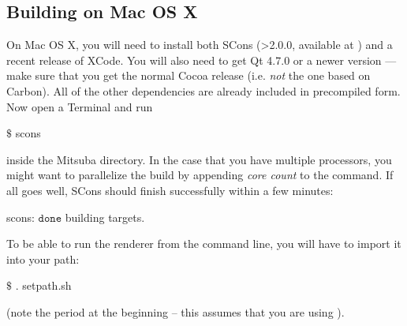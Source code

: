 \subsection{Building on Mac OS X}
On Mac OS X, you will need to install both SCons (>2.0.0, available at ) and 
a recent release of XCode. You will also need to get Qt 4.7.0 or a newer version
--- make sure that you get the normal Cocoa release (i.e. \emph{not} the one based on Carbon). All of the
other dependencies are already included in precompiled form.
Now open a Terminal and run
\begin{shell}
$\text{\$}$ scons
\end{shell}
inside the Mitsuba directory. In the case that you have multiple processors, you might want to parallelize the build by appending \emph{core count} to the command.
If all goes well, SCons should finish successfully within a few minutes:
\begin{shell}
scons: $\texttt{done}$ building targets.
\end{shell}
To be able to run the renderer from the command line, you will have to import it into your path:
\begin{shell}
$\text{\$}$ . setpath.sh
\end{shell}
(note the period at the beginning -- this assumes that you are using ).

